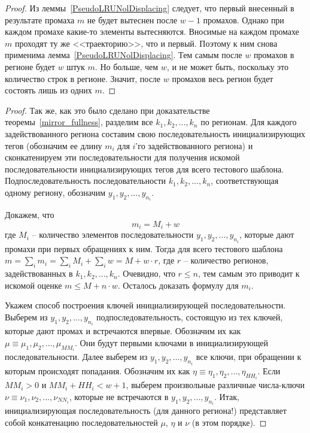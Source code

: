 \theoremtext{\ref{thm:PseudoLRU_essential}}{\PseudoLRUEssential}
\begin{proof}
    Из леммы~\ref{PseudoLRUNolDisplacing} следует, что первый внесенный в результате промаха $m$ не будет вытеснен после $w{-}1$ промахов. Однако при каждом промахе какие-то элементы вытесняются. Вносимые на каждом промахе $m$ проходят ту же <<траекторию>>, что и первый. Поэтому к ним снова применима лемма~\ref{PseudoLRUNolDisplacing}. Тем самым после $w$ промахов в регионе будет $w$ штук $m$. Но больше, чем $w$, и не может быть, поскольку это количество строк в регионе. Значит, после $w$ промахов весь регион будет состоять лишь из одних $m$.
\end{proof}

\theoremtext{\ref{thm_mirror_lenth_lru}}{\UpperBoundLRUMirror}
\begin{proof}
  Так же, как это было сделано при доказательстве
  теоремы~\ref{mirror_fullness}, разделим все $k_1, k_2, ..., k_n$
  по регионам. Для каждого задействованного региона составим свою
  последовательность инициализирующих тегов (обозначим ее длину $m_i$
  для $i$'го задействованного региона) и сконкатенируем эти
  последовательности для получения искомой последовательности
  инициализирующих тегов для всего тестового шаблона.
  Подпоследовательность последовательности $k_1, k_2, ..., k_n$,
  соответствующая одному региону, обозначим $y_1, y_2, ...,
  y_{n_i}$.

  Докажем, что $$m_i = M_i + w$$ где $M_i$ -- количество
  элементов последовательности $y_1, y_2, ..., y_{n_i}$, которые дают
  промахи при первых обращениях к ним. Тогда для всего тестового
  шаблона $m = \sum\limits_i m_i = \sum\limits_i M_i + \sum\limits_i w =
  M + w \cdot r$, где $r$ -- количество регионов, задействованных в
  $k_1, k_2, ..., k_n$. Очевидно, что $r \leqslant n$, тем самым это
  приводит к искомой оценке $m \leqslant M + n \cdot w$. Осталось
  доказать формулу для $m_i$.

  Укажем способ построения ключей инициализирующей последовательности. Выберем из $y_1, y_2, ..., y_{n_i}$ подпоследовательность,
  состоящую из тех ключей, которые дают промах и встречаются
  впервые. Обозначим их как $\mu \equiv \mu_1, \mu_2, ..., \mu_{MM_i}$. Они будут первыми ключами в   инициализирующей последовательности. Далее выберем из $y_1, y_2, ..., y_{n_i}$
  все ключи, при обращении к которым происходят попадания.
  Обозначим их как $\eta \equiv \eta_1, \eta_2, ..., \eta_{HH_i}$. Если $MM_i > 0$ и $MM_i +
  HH_i < w + 1$, выберем произвольные различные числа-ключи $\nu \equiv \nu_1, \nu_2,
  ..., \nu_{NN_i}$, которые не встречаются в $y_1, y_2, ..., y_{n_i}$. Итак, инициализирующая последовательность (для данного региона!) представляет собой конкатенацию последовательностей $\mu$, $\eta$ и $\nu$ (в этом порядке).


\end{proof}
